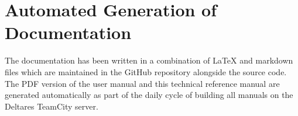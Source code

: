 \section{Automated Generation of Documentation}

The documentation has been written in a combination of LaTeX and markdown files which are maintained in the GitHub repository alongside the source code.
The PDF version of the user manual and this technical reference manual are generated automatically as part of the daily cycle of building all manuals on the Deltares TeamCity server.